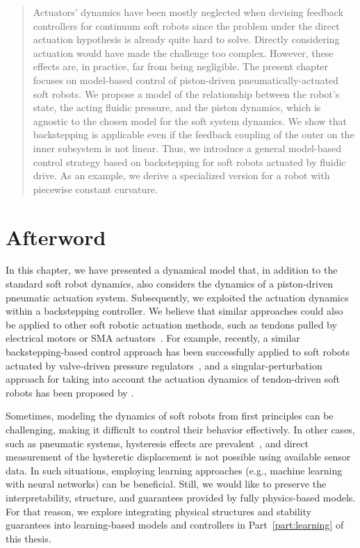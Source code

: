\pagebreak

\begin{abstract}
    Actuators' dynamics have been mostly neglected when devising feedback controllers for continuum soft robots since the problem under the direct actuation hypothesis is already quite hard to solve. Directly considering actuation would have made the challenge too complex. However, these effects are, in practice, far from being negligible. The present chapter focuses on model-based control of piston-driven pneumatically-actuated soft robots. We propose a model of the relationship between the robot's state, the acting fluidic pressure, and the piston dynamics, which is agnostic to the chosen model for the soft system dynamics. 
    We show that backstepping is applicable even if the feedback coupling of the outer on the inner subsystem is not linear.
    Thus, we introduce a general model-based control strategy based on backstepping for soft robots actuated by fluidic drive. As an example, we derive a specialized version for a robot with piecewise constant curvature. 
\end{abstract}


\newpage








\section*{Afterword}
In this chapter, we have presented a dynamical model that, in addition to the standard soft robot dynamics, also considers the dynamics of a piston-driven pneumatic actuation system. Subsequently, we exploited the actuation dynamics within a backstepping controller.
We believe that similar approaches could also be applied to other soft robotic actuation methods, such as tendons pulled by electrical motors or \gls{SMA} actuators~\citep{zaidi2021actuation}.
For example, recently, a similar backstepping-based control approach has been successfully applied to soft robots actuated by valve-driven pressure regulators~\citep{franco2024model}, and a singular-perturbation approach for taking into account the actuation dynamics of tendon-driven soft robots has been proposed by \citet{ribeiro2025singular}.

Sometimes, modeling the dynamics of soft robots from first principles can be challenging, making it difficult to control their behavior effectively. In other cases, such as pneumatic systems, hysteresis effects are prevalent~\citep{vo2010new}, and direct measurement of the hysteretic displacement is not possible using available sensor data.
In such situations, employing learning approaches (e.g., machine learning with neural networks) can be beneficial. Still, we would like to preserve the interpretability, structure, and guarantees provided by fully physics-based models. For that reason, we explore integrating physical structures and stability guarantees into learning-based models and controllers in Part~\ref{part:learning} of this thesis.
